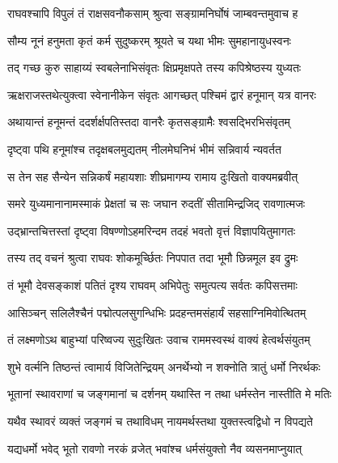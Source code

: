 
\twolineshloka
{राघवश्चापि विपुलं तं राक्षसवनौकसाम्}
{श्रुत्वा सङ्ग्रामनिर्घोषं जाम्बवन्तमुवाच ह} %

\twolineshloka
{सौम्य नूनं हनुमता कृतं कर्म सुदुष्करम्}
{श्रूयते च यथा भीमः सुमहानायुधस्वनः} %

\twolineshloka
{तद् गच्छ कुरु साहाय्यं स्वबलेनाभिसंवृतः}
{क्षिप्रमृक्षपते तस्य कपिश्रेष्ठस्य युध्यतः} %

\twolineshloka
{ऋक्षराजस्तथेत्युक्त्वा स्वेनानीकेन संवृतः}
{आगच्छत् पश्चिमं द्वारं हनूमान् यत्र वानरः} %

\twolineshloka
{अथायान्तं हनूमन्तं ददर्शर्क्षपतिस्तदा}
{वानरैः कृतसङ्ग्रामैः श्वसद्भिरभिसंवृतम्} %

\twolineshloka
{दृष्ट्वा पथि हनूमांश्च तदृक्षबलमुद्यतम्}
{नीलमेघनिभं भीमं सन्निवार्य न्यवर्तत} %

\twolineshloka
{स तेन सह सैन्येन सन्निकर्षं महायशाः}
{शीघ्रमागम्य रामाय दुःखितो वाक्यमब्रवीत्} %

\twolineshloka
{समरे युध्यमानानामस्माकं प्रेक्षतां च सः}
{जघान रुदतीं सीतामिन्द्रजिद् रावणात्मजः} %

\twolineshloka
{उद्भ्रान्तचित्तस्तां दृष्ट्वा विषण्णोऽहमरिन्दम}
{तदहं भवतो वृत्तं विज्ञापयितुमागतः} %

\twolineshloka
{तस्य तद् वचनं श्रुत्वा राघवः शोकमूर्च्छितः}
{निपपात तदा भूमौ छिन्नमूल इव द्रुमः} %

\twolineshloka
{तं भूमौ देवसङ्काशं पतितं दृश्य राघवम्}
{अभिपेतुः समुत्पत्य सर्वतः कपिसत्तमाः} %

\twolineshloka
{आसिञ्चन् सलिलैश्चैनं पद्मोत्पलसुगन्धिभिः}
{प्रदहन्तमसंहार्यं सहसाग्निमिवोत्थितम्} %

\twolineshloka
{तं लक्ष्मणोऽथ बाहुभ्यां परिष्वज्य सुदुःखितः}
{उवाच राममस्वस्थं वाक्यं हेत्वर्थसंयुतम्} %

\twolineshloka
{शुभे वर्त्मनि तिष्ठन्तं त्वामार्य विजितेन्द्रियम्}
{अनर्थेभ्यो न शक्नोति त्रातुं धर्मो निरर्थकः} %

\twolineshloka
{भूतानां स्थावराणां च जङ्गमानां च दर्शनम्}
{यथास्ति न तथा धर्मस्तेन नास्तीति मे मतिः} %

\twolineshloka
{यथैव स्थावरं व्यक्तं जङ्गमं च तथाविधम्}
{नायमर्थस्तथा युक्तस्त्वद्विधो न विपद्यते} %

\twolineshloka
{यद्यधर्मो भवेद् भूतो रावणो नरकं व्रजेत्}
{भवांश्च धर्मसंयुक्तो नैव व्यसनमाप्नुयात्} %


